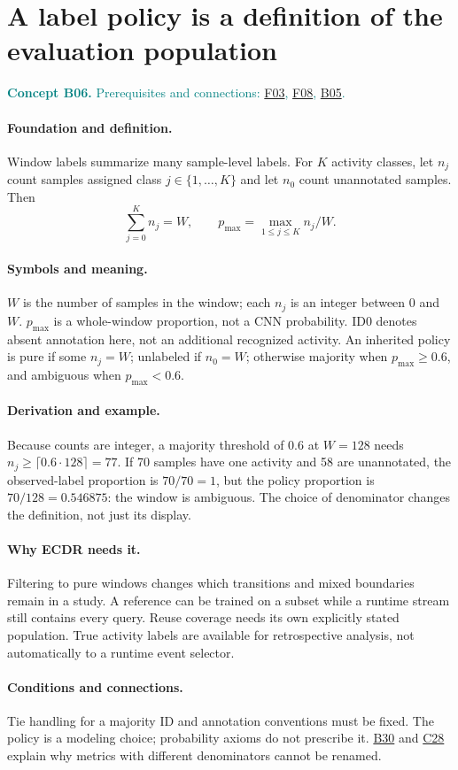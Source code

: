 \documentclass[11pt,a4paper]{article}
\newcommand{\conceptid}{Front matter}
\newcommand{\concept}[3]{\clearpage\renewcommand{\conceptid}{#1}%
\section{#2}\label{concept:#1}%
\textcolor{teal}{\textbf{Concept #1.} Prerequisites and connections: #3.}\par
\typeout{ECDR-CONCEPT-START #1 PAGE=\thepage}}
\begin{document}
\concept{B06}{A label policy is a definition of the evaluation population}{\hyperref[concept:F03]{F03}, \hyperref[concept:F08]{F08}, \hyperref[concept:B05]{B05}}
\paragraph{Foundation and definition.}
Window labels summarize many sample-level labels. For $K$ activity classes,
let $n_j$ count samples assigned class $j\in\{1,\ldots,K\}$ and let $n_0$
count unannotated samples. Then
\[
 \sum_{j=0}^{K}n_j=W,\qquad
 p_{\max}=\max_{1\le j\le K}n_j/W.
\]
\paragraph{Symbols and meaning.}
$W$ is the number of samples in the window; each $n_j$ is an integer
between 0 and $W$. $p_{\max}$ is a whole-window proportion, not a CNN
probability. ID0 denotes absent annotation here, not an additional
recognized activity. An inherited policy is pure if some $n_j=W$;
unlabeled if $n_0=W$; otherwise majority when $p_{\max}\ge0.6$, and
ambiguous when $p_{\max}<0.6$.
\paragraph{Derivation and example.}
Because counts are integer, a majority threshold of 0.6 at $W=128$ needs
$n_j\ge\lceil0.6\cdot128\rceil=77$. If 70 samples have one activity and
58 are unannotated, the observed-label proportion is $70/70=1$, but the
policy proportion is $70/128=0.546875$: the window is ambiguous. The
choice of denominator changes the definition, not just its display.
\paragraph{Why ECDR needs it.}
Filtering to pure windows changes which transitions and mixed boundaries
remain in a study. A reference can be trained on a subset while a runtime
stream still contains every query. Reuse coverage needs its own explicitly
stated population. True activity labels are available for retrospective
analysis, not automatically to a runtime event selector.
\paragraph{Conditions and connections.}
Tie handling for a majority ID and annotation conventions must be fixed.
The policy is a modeling choice; probability axioms do not prescribe it.
\hyperref[concept:B30]{B30} and \hyperref[concept:C28]{C28} explain why metrics with different denominators cannot be renamed.
\par\label{endconcept:B06}
\end{document}
